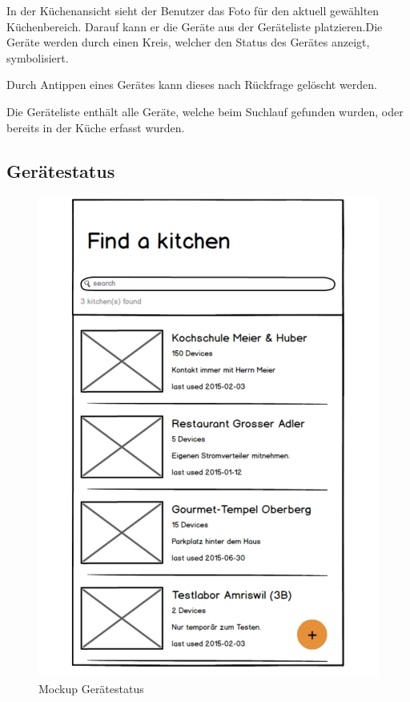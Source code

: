 In der Küchenansicht sieht der Benutzer das Foto für den aktuell gewählten Küchenbereich. Darauf kann er die Geräte aus der Geräteliste platzieren.Die Geräte werden durch einen Kreis, welcher den Status des Gerätes anzeigt, symbolisiert.

Durch Antippen eines Gerätes kann dieses nach Rückfrage gelöscht werden.

Die Geräteliste enthält alle Geräte, welche beim Suchlauf gefunden wurden, oder bereits in der Küche erfasst wurden.

\WFclear

\subsection{Gerätestatus}
\label{subsec:Gerätestatus}

\begin{figure}
	\begin{center}
		\includegraphics[page=5,trim=0 0 0 0,clip,scale=0.21]{uiux/res/mockups}
		\caption{Mockup Gerätestatus}
		\label{abb:mockDeviceDetail}
	\end{center}
\end{figure}

